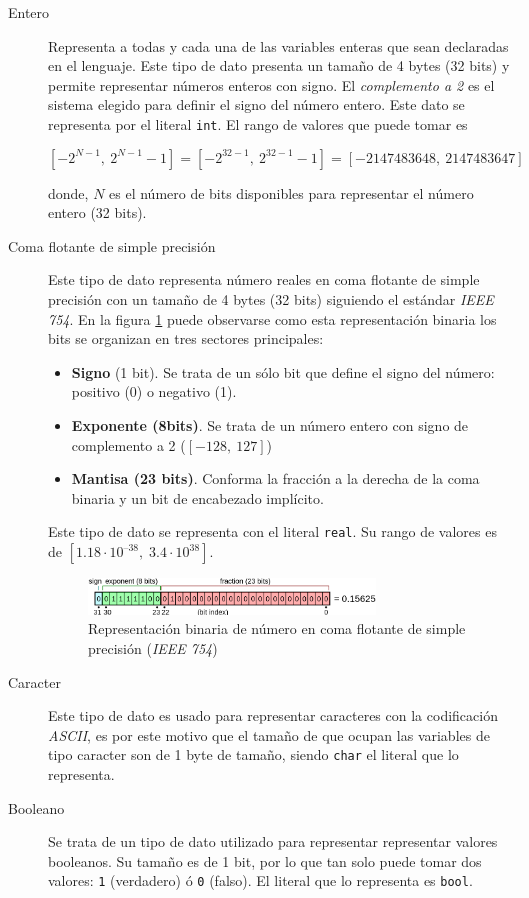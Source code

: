\documentclass[11pt, english]{article}
\begin{document}
\begin{description}
	\item[Entero] Representa a todas y cada una de las variables enteras que sean declaradas en el lenguaje. Este tipo de dato presenta un tamaño de 4 bytes (32 bits) y permite representar números enteros con signo. El \emph{complemento a 2} es el sistema elegido para definir el signo del número entero. Este dato se representa por el literal \texttt{int}. El rango de valores que puede tomar es

	\begin{equation}\label{eq:equation1}
		\left [-2^{N-1},\: 2^{N-1}-1 \right ] = \left [-2^{32-1},\: 2^{32-1}-1 \right] = \left [-2147483648,\: 2147483647 \right]
	\end{equation}

	donde, $N$ es el número de bits disponibles para representar el número entero (32 bits).
	\item[Coma flotante de simple precisión] Este tipo de dato representa número reales en coma flotante de simple precisión con un tamaño de 4 bytes (32 bits) siguiendo el estándar \emph{IEEE 754}. En la figura \ref{fig:figure1} puede observarse como esta representación binaria los bits se organizan en tres sectores principales:
	\begin{itemize}
		\item \textbf{Signo} (1 bit). Se trata de un sólo bit que define el signo del número: positivo (0) o negativo (1).
		\item  \textbf{Exponente (8bits)}. Se trata de un número entero con signo de complemento a 2 ($\left [ -128,\: 127\right ]$)
		\item \textbf{Mantisa (23 bits)}. Conforma la fracción a la derecha de la coma binaria y un bit de encabezado implícito.
	\end{itemize}
	Este tipo de dato se representa con el literal \texttt{real}. Su rango de valores es de $\left [ 1.18 \cdot 10^{–38},\; 3.4 \cdot 10^{38} \right ]$.
	\begin{figure}[H]\label{fig:figure1}
		\centering
		\includegraphics[width=0.75\textwidth]{../res/pics/data-types/float_diag.png}
		\caption{Representación binaria de número en coma flotante de simple precisión (\emph{IEEE 754})}
	\end{figure}

	\item[Caracter] Este tipo de dato es usado para representar caracteres con la codificación \emph{ASCII}, es por este motivo que el tamaño de que ocupan las variables de tipo caracter son de 1 byte de tamaño, siendo \texttt{char} el literal que lo representa.
	\item[Booleano] Se trata de un tipo de dato utilizado para representar representar valores booleanos. Su tamaño es de 1 bit, por lo que tan solo puede tomar dos valores: \texttt{1} (verdadero) ó \texttt{0} (falso). El literal que lo representa es \texttt{bool}.
\end{description}
\end{document}

